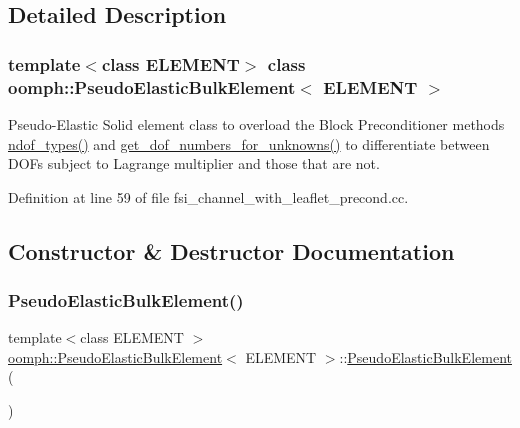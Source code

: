 \subsection{Detailed Description}
\subsubsection*{template$<$class E\+L\+E\+M\+E\+NT$>$\newline
class oomph\+::\+Pseudo\+Elastic\+Bulk\+Element$<$ E\+L\+E\+M\+E\+N\+T $>$}

Pseudo-\/\+Elastic Solid element class to overload the Block Preconditioner methods \hyperlink{classoomph_1_1PseudoElasticBulkElement_a18674d52b96db8800d31e89ffd465175}{ndof\+\_\+types()} and \hyperlink{classoomph_1_1PseudoElasticBulkElement_a8f1dc2011100324953293470a18f3080}{get\+\_\+dof\+\_\+numbers\+\_\+for\+\_\+unknowns()} to differentiate between D\+O\+Fs subject to Lagrange multiplier and those that are not. 

Definition at line 59 of file fsi\+\_\+channel\+\_\+with\+\_\+leaflet\+\_\+precond.\+cc.



\subsection{Constructor \& Destructor Documentation}
\mbox{\label{classoomph_1_1PseudoElasticBulkElement_a38c03edd9639522e713ef9bf679d7e5a}} 
\subsubsection{\texorpdfstring{Pseudo\+Elastic\+Bulk\+Element()}{PseudoElasticBulkElement()}}
{\footnotesize\ttfamily template$<$class E\+L\+E\+M\+E\+NT $>$ \\
\hyperlink{classoomph_1_1PseudoElasticBulkElement}{oomph\+::\+Pseudo\+Elastic\+Bulk\+Element}$<$ E\+L\+E\+M\+E\+NT $>$\+::\hyperlink{classoomph_1_1PseudoElasticBulkElement}{Pseudo\+Elastic\+Bulk\+Element} (\begin{DoxyParamCaption}{ }\end{DoxyParamCaption})\hspace{0.3cm}{\ttfamily [inline]}}



